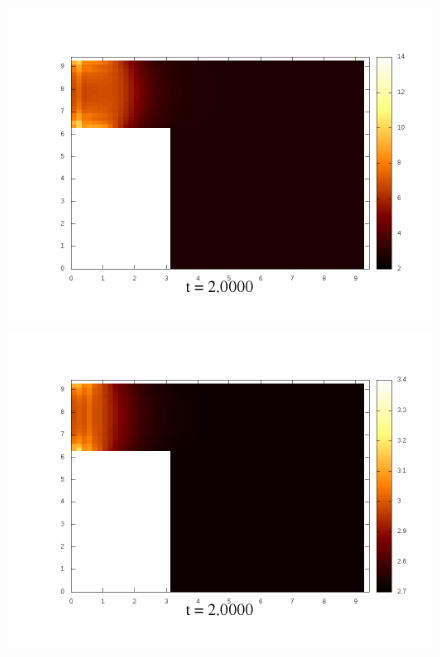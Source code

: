 \documentclass[a4paper, 12pt]{article}
\begin{document}
\begin{figure}[h]
		\begin{minipage}[h]{0.4\linewidth}
			\includegraphics[width=1\linewidth]{./img/01_1_1/G/10}
		\end{minipage}
		\hfill
		\begin{minipage}[h]{0.4\linewidth}
			\includegraphics[width=1\linewidth]{./img/01_1_01/G/10}
		\end{minipage}
\end{figure}
\end{document}
